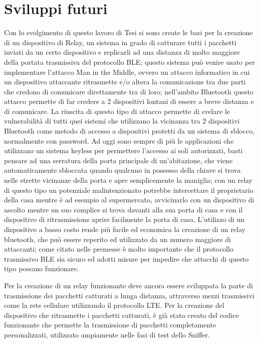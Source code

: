 \section{Sviluppi futuri}
Con lo svolgimento di questo lavoro di Tesi si sono create le basi per la creazione di un dispositivo di Relay, un sistema in grado di catturare tutti i pacchetti inviati da un certo dispositivo e replicarli ad una distanza di molto maggiore della portata trasmissiva del protocollo BLE; questo sistema può venire usato per implementare l'attacco Man in the Middle, ovvero un attacco informatico in cui un dispositivo attaccante ritrasmette e/o altera la comunicazione tra due parti che credono di comunicare direttamente tra di loro; nell'ambito Bluetooth questo attacco permette di far credere a 2 dispositivi lontani  di essere a breve distanza e di comunicare. 
La riuscita di questo tipo di attacco permette di svelare le vulnerabilità di tutti quei sistemi che utilizzano la vicinanza tra 2 dispositivi Bluetooth come metodo di accesso a dispositivi protetti da un sistema di sblocco, normalmente con password.
Ad oggi sono sempre di più le applicazioni che utilizzano un sistema keyless per permettere l'accesso ai soli autorizzati, basti pensare ad una serratura della porta principale di un'abitazione, che viene automaticamente sbloccata quando qualcuno in possesso della chiave si trova nelle strette vicinanze della porta e apre semplicemente la maniglia; con un relay di questo tipo un potenziale malintenzionato potrebbe intercettare il proprietario della casa mentre è ad esempio al supermercato, avvicinarlo con un dispositivo di ascolto mentre un suo complice si trova davanti alla sua porta di casa e con il dispositivo di ritrasmissione aprire facilmente la porta di casa.
L'utilizzo di un dispositivo a basso costo rende più facile ed economica la creazione di un relay bluetooth, che può essere reperito ed utilizzato da un numero maggiore di attaccanti; come citato nelle premesse è molto importante che il protocollo trasmissivo BLE sia sicuro ed adotti misure per impedire che attacchi di questo tipo possano funzionare.

Per la creazione di un relay funzionante deve ancora essere sviluppata la parte di trasmissione dei pacchetti catturati a lunga distanza, attraverso mezzi trasmissivi come la rete cellulare utilizzando il protocollo LTE. Per la creazione del dispositivo che ritrasmette i pacchetti catturati, è già stato creato del codice funzionante che permette la trasmissione di pacchetti completamente personalizzati, utilizzato ampiamente nelle fasi di test dello Sniffer.